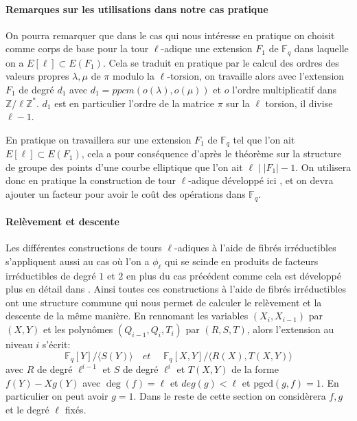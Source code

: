 \documentclass[10pt,a4paper]{book}
\theoremstyle{plain}
\theoremstyle{definition}
\theoremstyle{definition}
\theoremstyle{definition}
\theoremstyle{definition}
\theoremstyle{remark}
\theoremstyle{remark}
\begin{document}
\paragraph{Remarques sur les utilisations dans notre cas pratique}
On pourra remarquer que dans le cas qui nous intéresse en pratique on choisit comme corps de base pour la tour $\ell$-adique une extension $F_1$ de $\mathbb{F}_q$ dans laquelle on a $E[\ell] \subset E(F_1)$. Cela se traduit en pratique par le calcul des ordres des valeurs propres $\lambda, \mu$ de $\pi$ modulo la $\ell$-torsion, on travaille alors avec l'extension $F_1$ de degré $d_1$ avec $d_1=ppcm(o(\lambda),o(\mu))$ et $o$ l'ordre multiplicatif dans $\mathbb{Z}/\ell\mathbb{Z}^*$. $d_1$ est en particulier l'ordre de la matrice $\pi$ sur la $\ell$ torsion, il divise $\ell-1$.  

En pratique on travaillera sur une extension $F_1$ de $\mathbb{F}_q$ tel que l'on ait $E[\ell] \subset E(F_1)$, cela a pour conséquence d'après le théorème sur la structure de groupe des points d'une courbe elliptique que l'on ait $\ell \mid |F_1|-1$. On utilisera donc en pratique la construction de tour $\ell$-adique développé ici , et on devra ajouter un facteur pour avoir le coût des opérations dans $\mathbb{F}_q$.

\paragraph{Relèvement et descente}
Les différentes constructions de tours $\ell$-adiques à l'aide de fibrés irréductibles s'appliquent aussi au cas où l'on a $\phi_{\ell}$ qui se scinde en produits de facteurs irréductibles de degré $1$ et $2$ en plus du cas précédent comme cela est développé plus en détail dans \cite{DeFeo-Doliskani-Schost13}. Ainsi toutes ces constructions à l'aide de fibrés irréductibles ont une structure commune qui nous permet de calculer le relèvement et la descente de la même manière. En rennomant les variables $(X_i,X_{i-1})$ par $(X,Y)$ et les polynômes $(Q_{i-1},Q_{i},T_i)$ par $(R,S,T)$, alors l'extension au niveau $i$ s'écrit:
\begin{equation}
\mathbb{F}_q[Y]/\langle S(Y) \rangle  \quad \textit{et } \quad \mathbb{F}_q[X,Y]/ \langle R(X), T(X,Y) \rangle
\end{equation}
avec $R$ de degré $\ell^{i-1}$ et $S$ de degré $\ell^i$ et $T(X,Y)$ de la forme $f(Y) -Xg(Y)$ avec $\deg(f)=\ell$ et $deg(g)< \ell$ et $ \mathrm{pgcd}(g,f)=1$. En particulier on peut avoir $g=1$. Dans le reste de cette section on considèrera $f,g$ et le degré $\ell$ fixés.
\end{document}
